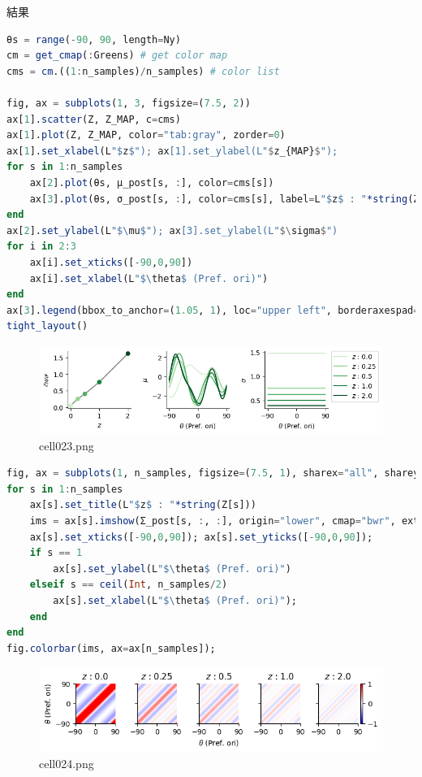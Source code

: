結果
\begin{lstlisting}[language=julia]
θs = range(-90, 90, length=Ny)
cm = get_cmap(:Greens) # get color map
cms = cm.((1:n_samples)/n_samples) # color list

fig, ax = subplots(1, 3, figsize=(7.5, 2))
ax[1].scatter(Z, Z_MAP, c=cms)
ax[1].plot(Z, Z_MAP, color="tab:gray", zorder=0)
ax[1].set_xlabel(L"$z$"); ax[1].set_ylabel(L"$z_{MAP}$"); 
for s in 1:n_samples
    ax[2].plot(θs, μ_post[s, :], color=cms[s])
    ax[3].plot(θs, σ_post[s, :], color=cms[s], label=L"$z$ : "*string(Z[s]))
end
ax[2].set_ylabel(L"$\mu$"); ax[3].set_ylabel(L"$\sigma$")
for i in 2:3
    ax[i].set_xticks([-90,0,90])
    ax[i].set_xlabel(L"$\theta$ (Pref. ori)")
end
ax[3].legend(bbox_to_anchor=(1.05, 1), loc="upper left", borderaxespad=0)
tight_layout()
\end{lstlisting}
\begin{figure}[ht]
	\centering
	\includegraphics[scale=0.8, max width=\linewidth]{./fig/bayesian-brain/neural-sampling/cell023.png}
	\caption{cell023.png}
	\label{cell023.png}
\end{figure}
\begin{lstlisting}[language=julia]
fig, ax = subplots(1, n_samples, figsize=(7.5, 1), sharex="all", sharey="all")
for s in 1:n_samples
    ax[s].set_title(L"$z$ : "*string(Z[s]))
    ims = ax[s].imshow(Σ_post[s, :, :], origin="lower", cmap="bwr", extent=(-90, 90, -90, 90), vmin=-1, vmax=1)
    ax[s].set_xticks([-90,0,90]); ax[s].set_yticks([-90,0,90]);
    if s == 1
        ax[s].set_ylabel(L"$\theta$ (Pref. ori)")
    elseif s == ceil(Int, n_samples/2) 
        ax[s].set_xlabel(L"$\theta$ (Pref. ori)"); 
    end
end
fig.colorbar(ims, ax=ax[n_samples]);
\end{lstlisting}
\begin{figure}[ht]
	\centering
	\includegraphics[scale=0.8, max width=\linewidth]{./fig/bayesian-brain/neural-sampling/cell024.png}
	\caption{cell024.png}
	\label{cell024.png}
\end{figure}
